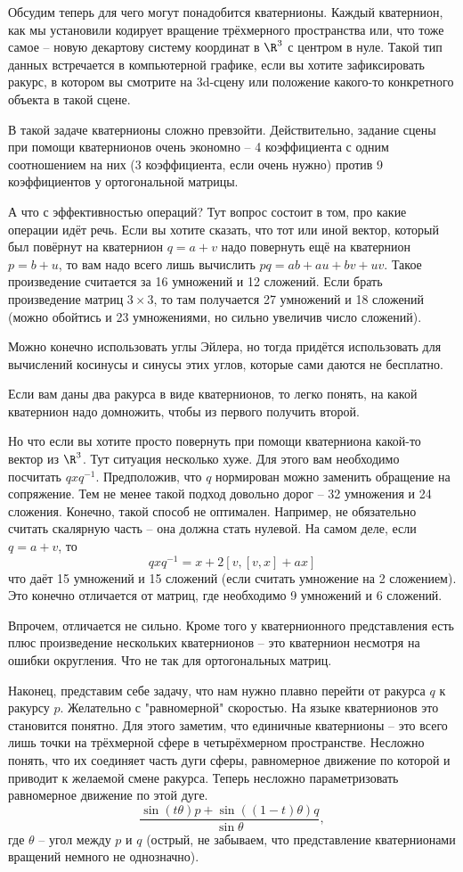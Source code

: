 Обсудим теперь для чего могут понадобится кватернионы. Каждый кватернион, как мы установили кодирует вращение трёхмерного пространства или, что тоже самое -- новую декартову систему координат в $\R^3$ с центром в нуле. Такой тип данных встречается в компьютерной графике, если вы хотите зафиксировать ракурс, в котором вы смотрите на 3d-сцену или положение какого-то конкретного объекта в такой сцене.

В такой задаче кватернионы сложно превзойти. Действительно, задание сцены при помощи кватернионов очень экономно -- 4 коэффициента с одним соотношением на них (3 коэффициента, если очень нужно) против 9 коэффициентов у ортогональной матрицы.

А что с эффективностью операций? Тут вопрос состоит в том, про какие операции идёт речь. Если вы хотите сказать, что тот или иной вектор, который был повёрнут на кватернион $q=a+v$ надо повернуть ещё на кватернион $p=b+u$, то вам надо всего лишь вычислить $pq=ab+au+bv+uv$. Такое произведение считается за 16 умножений и 12 сложений. Если брать произведение матриц $3\times 3$, то там получается 27 умножений и 18 сложений (можно обойтись и 23 умножениями, но сильно увеличив число сложений).

Можно конечно использовать углы Эйлера, но тогда придётся использовать для вычислений косинусы и синусы этих углов, которые сами даются не бесплатно.

Если вам даны два ракурса в виде кватернионов, то легко понять, на какой кватернион надо домножить, чтобы из первого получить второй.

Но что если вы хотите просто повернуть при помощи кватерниона какой-то вектор из $\R^3$. Тут ситуация несколько хуже. Для этого вам необходимо посчитать $qxq^{-1}$. Предположив, что $q$ нормирован можно заменить обращение на сопряжение. Тем не менее такой подход довольно дорог -- 32 умножения и 24 сложения. Конечно, такой способ не оптимален. Например, не обязательно считать скалярную часть -- она должна стать нулевой. На самом деле, если $q=a+v$, то 
$$qxq^{-1}=x+ 2[v, [v,x]+ ax]$$
что даёт 15 умножений и 15 сложений (если считать умножение на 2 сложением). Это конечно отличается от матриц, где необходимо 9 умножений и 6 сложений.

Впрочем, отличается не сильно. Кроме того у кватернионного представления есть плюс произведение нескольких кватернионов -- это кватернион несмотря на ошибки округления. Что не так для ортогональных матриц.

Наконец, представим себе задачу, что нам нужно плавно перейти от ракурса $q$ к ракурсу $p$. Желательно с "равномерной" скоростью. На языке кватернионов это становится понятно. Для этого заметим, что единичные кватернионы -- это всего лишь точки на трёхмерной сфере в четырёхмерном пространстве. Несложно понять, что их соединяет часть дуги сферы, равномерное движение по которой и приводит к желаемой смене ракурса. Теперь несложно параметризовать равномерное движение по этой дуге. 
$$ \frac{\sin(t\theta)p + \sin ((1-t)\theta) q}{\sin \theta},$$
где $\theta$ -- угол между $p$ и $q$ (острый, не забываем, что представление кватернионами вращений немного не однозначно).





